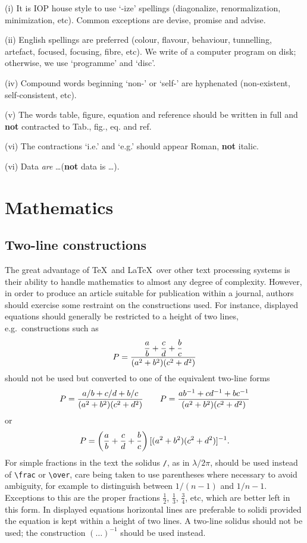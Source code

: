 (i) It is IOP house style to use `-ize' spellings (diagonalize,
renormalization, minimization, etc). Common exceptions are devise,
promise and advise.

(ii) English spellings are preferred (colour, flavour, behaviour,
tunnelling, artefact, focused, focusing, fibre, etc). We write of a
computer program on disk; otherwise, we use `programme' and `disc'.

(iv) Compound words beginning `non-' or `self-' are hyphenated
(non-existent, self-consistent, etc).

(v) The words table, figure, equation and reference should be written
in full and {\bf not} contracted to Tab., fig., eq. and ref.

(vi) The contractions `i.e.' and `e.g.' should appear Roman, {\bf not}
italic.

(vi) Data {\it are} \dots ({\bf not} data is \dots).


\section{Mathematics}
\subsection{Two-line constructions}
The great advantage of \TeX\ and \LaTeX\
over other text processing systems is their
ability to handle mathematics to almost any degree of complexity. However,
in order to produce an article suitable for publication within a journal,
authors should exercise some restraint on the constructions used.
For instance, displayed equations should generally be restricted to a
height of two lines, e.g.\ constructions such as
\[
P={{\displaystyle{a\over b}+{c\over d}+{b\over c}}\over
(a^2+b^2)(c^2+d^2)}
\]
should not be used but converted to one of the
equivalent two-line forms
\[
P={a/b+c/d+b/c\over (a^2+b^2)(c^2+d^2)}
\qquad P={ab^{-1}+cd^{-1}+bc^{-1} \over
(a^2+b^2)(c^2+d^2)}
\]
or
\[
P=\left({a\over b}+{c\over d}+{b\over c}\right)
[(a^2+b^2)(c^2+d^2)]^{-1}.
\]
For simple fractions in the text the solidus \verb"/", as in
$\lambda/2\pi$, should be used instead of \verb"\frac" or \verb"\over",
care
being taken to use parentheses where necessary to avoid ambiguity, for
example to distinguish between $1/(n-1)$ and $1/n-1$. Exceptions to
this are the proper fractions $\frac12$, $\frac13$, $\frac34$,
etc, which are better left in this form. In displayed equations
horizontal lines are preferable to solidi provided the equation is
kept within a height of two lines. A two-line solidus should not be
used; the construction $(\ldots)^{-1}$ should be used instead.

